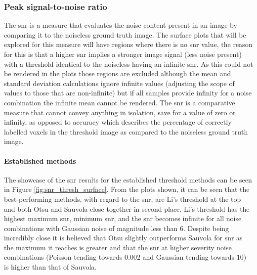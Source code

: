 \subsubsection{Peak signal-to-noise ratio}
The \gls{snr} is a measure that evaluates the noise content present in an image by comparing it to the noiseless ground truth image. The surface plots that will be explored for this measure will have regions where there is no \gls{snr} value, the reason for this is that a higher \gls{snr} implies a stronger image signal (less noise present) with a threshold identical to the noiseless having an infinite \gls{snr}. As this could not be rendered in the plots those regions are excluded although the mean and standard deviation calculations ignore infinite values (adjusting the scope of values to those that are non-infinite) but if all samples provide infinity for a noise combination the infinite mean cannot be rendered. The \gls{snr} is a comparative measure that cannot convey anything in isolation, save for a value of zero or infinity, as opposed to accuracy which describes the percentage of correctly labelled voxels in the threshold image as compared to the noiseless ground truth image.

\paragraph{Established methods}
The showcase of the \gls{snr} results for the established threshold methods can be seen in Figure \ref{fig:snr_thresh_surface}. From the plots shown, it can be seen that the best-performing methods, with regard to the \gls{snr}, are Li's threshold at the top and both Otsu and Sauvola close together in second place. Li's threshold has the highest maximum \gls{snr}, minimum \gls{snr}, and the \gls{snr} becomes infinite for all noise combinations with Gaussian noise of magnitude less than $6$. Despite being incredibly close it is believed that Otsu slightly outperforms Sauvola for \gls{snr} as the maximum it reaches is greater and that the \gls{snr} at higher severity noise combinations (Poisson tending towards $0.002$ and Gaussian tending towards $10$) is higher than that of Sauvola.

